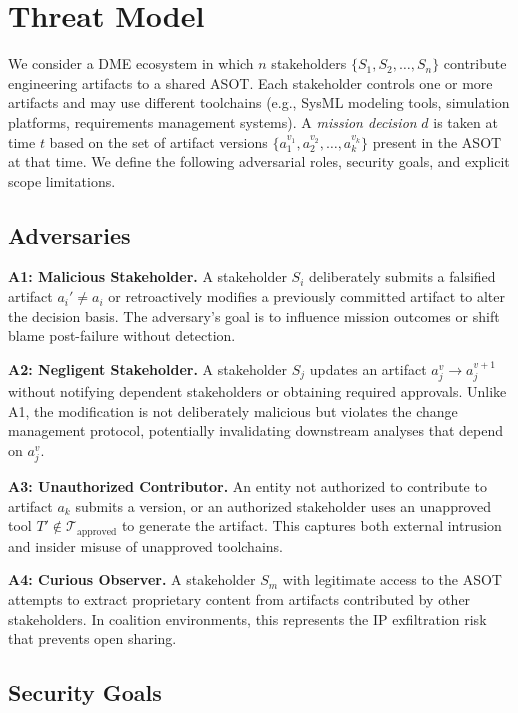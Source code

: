 \section{Threat Model}
\label{sec:threat-model}

We consider a DME ecosystem in which $n$ stakeholders $\{S_1, S_2, \ldots, S_n\}$ contribute engineering artifacts to a shared ASOT.
Each stakeholder controls one or more artifacts and may use different toolchains (e.g., SysML modeling tools, simulation platforms, requirements management systems).
A \emph{mission decision} $d$ is taken at time $t$ based on the set of artifact versions $\{a_1^{v_1}, a_2^{v_2}, \ldots, a_k^{v_k}\}$ present in the ASOT at that time.
We define the following adversarial roles, security goals, and explicit scope limitations.

\subsection{Adversaries}
\label{sec:adversaries}

\textbf{A1: Malicious Stakeholder.}
A stakeholder $S_i$ deliberately submits a falsified artifact $a_i' \neq a_i$ or retroactively modifies a previously committed artifact to alter the decision basis.
The adversary's goal is to influence mission outcomes or shift blame post-failure without detection.

\textbf{A2: Negligent Stakeholder.}
A stakeholder $S_j$ updates an artifact $a_j^{v} \rightarrow a_j^{v+1}$ without notifying dependent stakeholders or obtaining required approvals.
Unlike A1, the modification is not deliberately malicious but violates the change management protocol, potentially invalidating downstream analyses that depend on $a_j^{v}$.

\textbf{A3: Unauthorized Contributor.}
An entity not authorized to contribute to artifact $a_k$ submits a version, or an authorized stakeholder uses an unapproved tool $T' \notin \mathcal{T}_{\text{approved}}$ to generate the artifact.
This captures both external intrusion and insider misuse of unapproved toolchains.

\textbf{A4: Curious Observer.}
A stakeholder $S_m$ with legitimate access to the ASOT attempts to extract proprietary content from artifacts contributed by other stakeholders.
In coalition environments, this represents the IP exfiltration risk that prevents open sharing.

\subsection{Security Goals}
\label{sec:security-goals}

